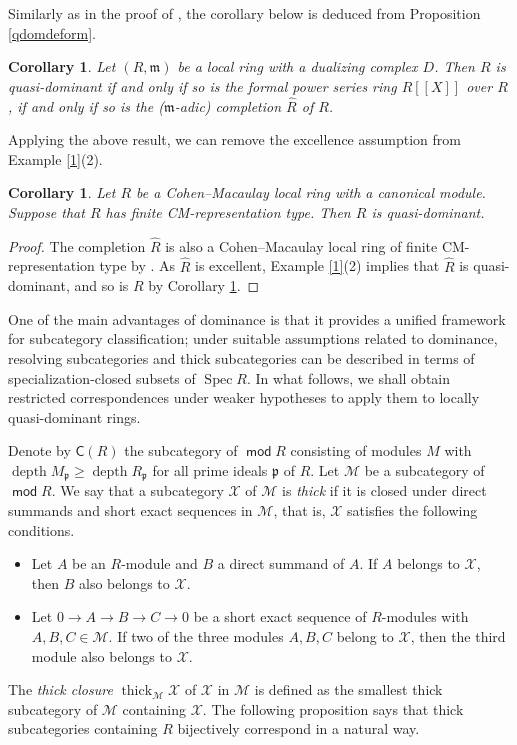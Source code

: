 \documentclass{amsart}
\newtheorem{cor}[thm]{Corollary}
\theoremstyle{definition}
\theoremstyle{remark}
\numberwithin{equation}{thm}
\def\c{\mathsf{C}}
\def\depth{\operatorname{depth}}
\def\ge{\geqslant}
\def\M{\mathcal{M}}
\def\m{\mathfrak{m}}
\def\mod{\operatorname{\mathsf{mod}}}
\def\p{\mathfrak{p}}
\def\thick{\operatorname{thick}}
\def\X{\mathcal{X}}
\begin{document}
Similarly as in the proof of \cite[Corollary 5.8]{T23}, the corollary below is deduced from Proposition \ref{qdomdeform}.

\begin{cor}\label{compqdom}
Let $(R,\m)$ be a local ring with a dualizing complex $D$.
Then $R$ is quasi-dominant if and only if so is the formal power series ring $R[\![X]\!]$ over $R$, if and only if so is the ($\m$-adic) completion $\widehat{R}$ of $R$.
\end{cor}

Applying the above result, we can remove the excellence assumption from Example \ref{1}(2).

\begin{cor}\label{8}
Let $R$ be a Cohen--Macaulay local ring with a canonical module.
Suppose that $R$ has finite CM-representation type.
Then $R$ is quasi-dominant.
\end{cor}

\begin{proof}
The completion $\widehat{R}$ is also a Cohen--Macaulay local ring of finite CM-representation type by \cite[Remark 4.9]{DKLO25}.
As $\widehat{R}$ is excellent, Example \ref{1}(2) implies that $\widehat{R}$ is quasi-dominant, and so is $R$ by Corollary \ref{compqdom}.
\end{proof}

One of the main advantages of dominance is that it provides a unified framework for subcategory classification; under suitable assumptions related to dominance, resolving subcategories and thick subcategories can be described in terms of specialization-closed subsets of $\operatorname{Spec} R$.
In what follows, we shall obtain restricted correspondences under weaker hypotheses to apply them to locally quasi-dominant rings. 

Denote by $\c(R)$ the subcategory of $\mod R$ consisting of modules $M$ with $\depth M_\p\ge\depth R_\p$ for all prime ideals $\p$ of $R$.
Let $\M$ be a subcategory of $\mod R$.
We say that a subcategory $\X$ of $\M$ is {\em thick} if it is closed under direct summands and short exact sequences in $\M$, that is, $\X$ satisfies the following conditions.
\begin{itemize}
\item
Let $A$ be an $R$-module and $B$ a direct summand of $A$.
If $A$ belongs to $\X$, then $B$ also belongs to $\X$.
\item
Let $0\to A\to B\to C\to0$ be a short exact sequence of $R$-modules with $A,B,C\in\M$.
If two of the three modules $A,B,C$ belong to $\X$, then the third module also belongs to $\X$.
\end{itemize}
The \textit{thick closure} $\thick_\M \X$ of $\X$ in $\M$ is defined as the smallest thick subcategory of $\M$ containing $\X$.
The following proposition says that thick subcategories containing $R$ bijectively correspond in a natural way.
\end{document}
